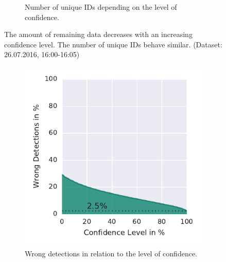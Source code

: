 \begin{figure}
\begin{subfigure}[b]{0.45\textwidth}
        \caption[Unique IDs]{Number of unique IDs depending on the level of confidence.}
        \label{fig:confVSids}
    \end{subfigure}
    \caption[Amount of Remaining Data]{The amount of remaining data decreases with an increasing confidence level. The number of unique IDs behave similar. (Dataset: 26.07.2016, 16:00-16:05)}
    \label{fig:confidence}
\end{figure}

\begin{figure}
	\centering
	\begin{subfigure}[b]{0.45\textwidth}
		\includegraphics[width=\textwidth]{Figures/confVSdetquality}
		\caption[Wrong Detections]{Wrong detections in relation to the level of confidence.}
		\label{fig:confVSdetquality}
	\end{subfigure}
	\begin{subfigure}[b]{0.45\textwidth}

\end{subfigure}
\end{figure}
